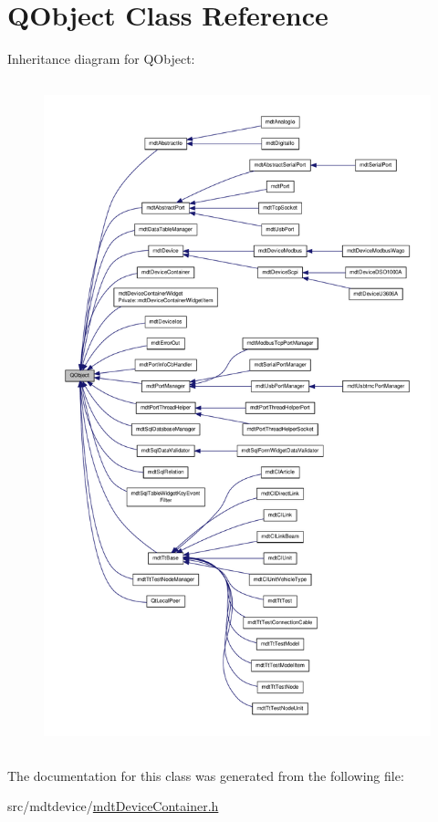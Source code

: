 \hypertarget{class_q_object}{\section{Q\-Object Class Reference}
\label{class_q_object}
}


Inheritance diagram for Q\-Object\-:\nopagebreak
\begin{figure}[H]
\begin{center}
\leavevmode
\includegraphics[height=550pt]{class_q_object__inherit__graph}
\end{center}
\end{figure}


The documentation for this class was generated from the following file\-:\begin{DoxyCompactItemize}
\item 
src/mdtdevice/\hyperlink{mdt_device_container_8h}{mdt\-Device\-Container.\-h}\end{DoxyCompactItemize}
